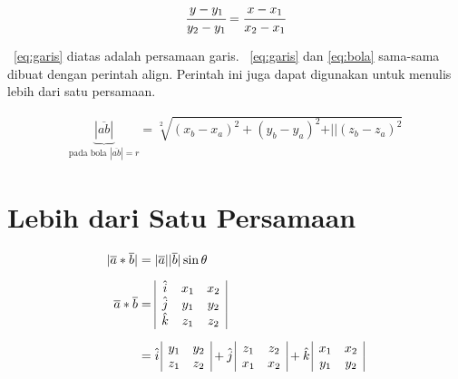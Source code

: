 \noindent \begin{align}\label{eq:garis}
	\cfrac{y - y_{1}}{y_{2} - y_{1}} = 
	\cfrac{x - x_{1}}{x_{2} - x_{1}}
\end{align}

\equ~\ref{eq:garis} diatas adalah persamaan garis. 
\equ~\ref{eq:garis} dan \ref{eq:bola} sama-sama dibuat dengan perintah \bslash
align. 
Perintah ini juga dapat digunakan untuk menulis lebih dari satu persamaan. 

\noindent \begin{align}\label{eq:bola}
	\underbrace{|\overline{ab}|}_{\text{pada bola $|\overline{ab}| = r$}} 
	= \sqrt[2]{(x_{b} - x_{a})^{2} + (y_{b} - y_{a})^{2} + 
		\vert\vert(z_{b} - z_{a})^{2}}
\end{align}

\section{Lebih dari Satu Persamaan}
\label{sec:multiEqu}
\noindent \begin{align}\label{eq:matriks}	
	|\overline{a} * \overline{b}| &= |\overline{a}| |\overline{b}| \sin\theta 
	\\[0.2cm]
	\overline{a} * \overline{b} &=  
	\begin{array}{| c c c |}
		\hat{i} & x_{1} & x_{2} \\
		\hat{j} & y_{1} & y_{2} \\
		\hat{k} & z_{1} & z_{2} \\
	\end{array} \nonumber \\[0.2cm]
	&= \hat{i} \,
	\begin{array}{ | c c | }
		y_{1} & y_{2} \\
		z_{1} & z_{2} \\
	\end{array} 
	+ \hat{j} \,
	\begin{array}{ | c c | }
		z_{1} & z_{2} \\
		x_{1} & x_{2} \\
	\end{array} 
	+ \hat{k} \,	
	\begin{array}{ | c c | }
		x_{1} & x_{2} \\
		y_{1} & y_{2} \\
	\end{array}
	\nonumber
\end{align}

